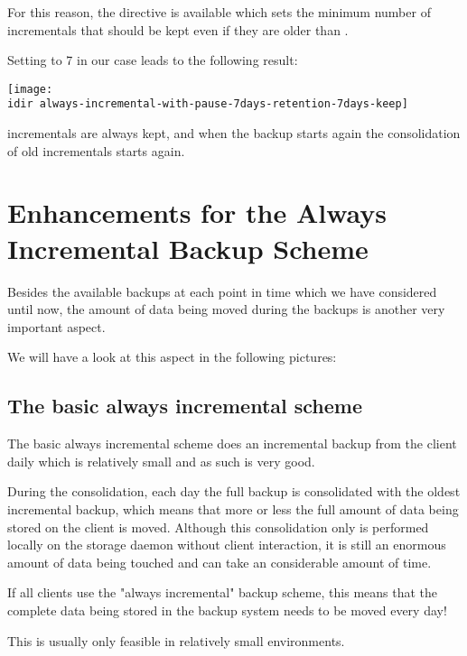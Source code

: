 For this reason, the directive  is available which sets the minimum number of incrementals that should be kept even if they are older than .

Setting  to 7 in our case leads to the following result:

\begin{center}
\texttt{[image: \\idir always-incremental-with-pause-7days-retention-7days-keep]}
\end{center}

 incrementals are always kept, and when the backup starts again the consolidation of old incrementals starts again.


\section{Enhancements for the Always Incremental Backup Scheme}

Besides the available backups at each point in time which we have considered until now, the amount of data being moved during the backups is another very important aspect.

We will have a look at this aspect in the following pictures:


\subsection{The basic always incremental scheme}

The basic always incremental scheme does an incremental backup from the client daily which is relatively small and as such is very good.

During the consolidation, each day the full backup is consolidated with the oldest incremental backup, which means that more or less the full amount of data being stored on the client is moved.
Although this consolidation only is performed locally on the storage daemon without client interaction, it is still an enormous amount of data being touched and can take an considerable amount of time.

If all clients use the "always incremental" backup scheme, this means that the complete data being stored in the backup system needs to be moved every day!

This is usually only feasible in relatively small environments.

